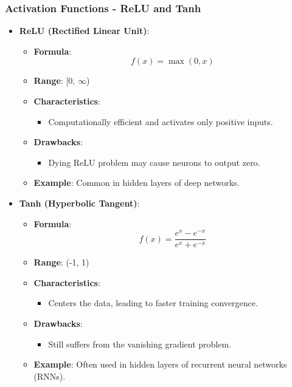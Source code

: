 \documentclass[aspectratio=169]{beamer}
\begin{document}
\begin{frame}[fragile]
    \frametitle{Activation Functions - ReLU and Tanh}
    \begin{itemize}
        \item \textbf{ReLU (Rectified Linear Unit)}:
        \begin{itemize}
            \item \textbf{Formula}:
            \begin{equation}
                f(x) = \max(0, x)
            \end{equation}
            \item \textbf{Range}: [0, $\infty$)
            \item \textbf{Characteristics}:
            \begin{itemize}
                \item Computationally efficient and activates only positive inputs.
            \end{itemize}
            \item \textbf{Drawbacks}:
            \begin{itemize}
                \item Dying ReLU problem may cause neurons to output zero.
            \end{itemize}
            \item \textbf{Example}: Common in hidden layers of deep networks.
        \end{itemize}
        
        \item \textbf{Tanh (Hyperbolic Tangent)}:
        \begin{itemize}
            \item \textbf{Formula}:
            \begin{equation}
                f(x) = \frac{e^x - e^{-x}}{e^x + e^{-x}}
            \end{equation}
            \item \textbf{Range}: (-1, 1)
            \item \textbf{Characteristics}:
            \begin{itemize}
                \item Centers the data, leading to faster training convergence.
            \end{itemize}
            \item \textbf{Drawbacks}:
            \begin{itemize}
                \item Still suffers from the vanishing gradient problem.
            \end{itemize}
            \item \textbf{Example}: Often used in hidden layers of recurrent neural networks (RNNs).
        \end{itemize}
    \end{itemize}
\end{frame}
\end{document}
